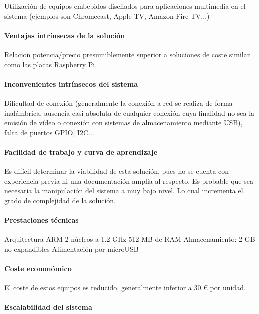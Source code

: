 Utilización de equipos embebidos diseñados para aplicaciones multimedia en el sistema (ejemplos son Chromecast, Apple TV, Amazon Fire TV...)

\paragraph{Ventajas intrínsecas de la solución}

Relacion potencia/precio presumiblemente superior a soluciones de coste similar como las placas Raspberry Pi.

\paragraph{Inconvenientes intrínsecos del sistema}

Dificultad de conexión (generalmente la conexión a red se realiza de forma inalámbrica, ausencia casi absoluta de cualquier conexión cuya finalidad no sea la emisión de vídeo o conexión con sistemas de almacenamiento mediante USB), falta de puertos GPIO, I2C...

\paragraph{Facilidad de trabajo y curva de aprendizaje}
Es difícil determinar la viabilidad de esta solución, pues no se cuenta con experiencia previa ni una documentación amplia al respecto.
Es probable que sea necesaria la manipulación del sistema a muy bajo nivel. Lo cual incrementa el grado de complejidad de la solución.

\paragraph{Prestaciones técnicas}
Arquitectura ARM
2 núcleos a 1.2 GHz
512 MB de RAM
Almacenamiento: 2 GB no expandibles
Alimentación por microUSB

\paragraph{Coste econonómico}

El coste de estos equipos es reducido, generalmente inferior a 30 € por unidad.

\paragraph{Escalabilidad del sistema}

